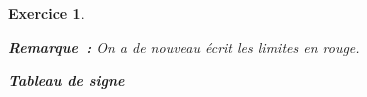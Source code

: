 \documentclass[10pt]{article}
\newtheorem{exo}{Exercice}
\begin{document}
\begin{exo}
\begin{enumerate}
\begin{multicols}{2}
\medskip

\textbf{Remarque~:} On a de nouveau écrit les limites en rouge.

\columnbreak

\begin{center}

\textbf{Tableau de signe}

\end{center}

\medskip

\begin{center}
\end{center}

\end{multicols}

\end{enumerate}

\end{exo}
\end{document}
